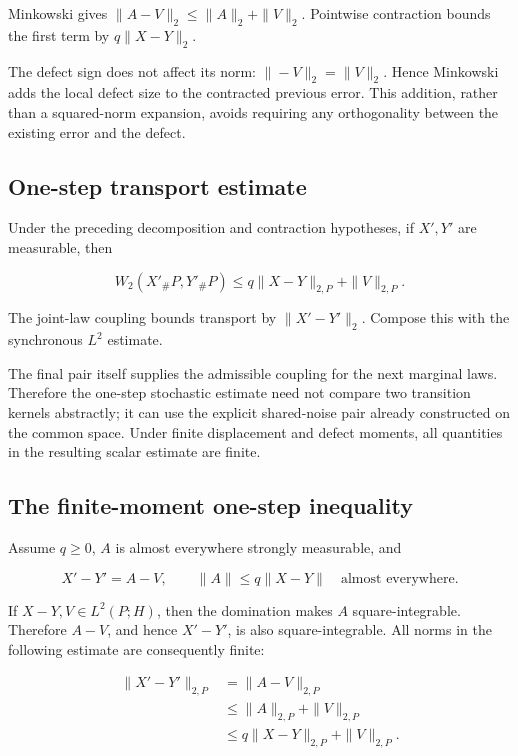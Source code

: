 \documentclass[11pt,a4paper]{article}
\begin{document}
Minkowski gives \(\|A-V\|_2\le\|A\|_2+\|V\|_2\). Pointwise contraction bounds the first term by \(q\|X-Y\|_2\).



The defect sign does not affect its norm: \(\|-V\|_2=\|V\|_2\). Hence Minkowski adds the local defect size to the contracted previous error. This addition, rather than a squared-norm expansion, avoids requiring any orthogonality between the existing error and the defect.


\subsection{\texorpdfstring{One-step transport estimate}{One-step transport estimate}}


Under the preceding decomposition and contraction hypotheses, if \(X',Y'\) are measurable, then

\[W_2(X'_\#P,Y'_\#P)\le q\|X-Y\|_{2,P}+\|V\|_{2,P}.\]

The joint-law coupling bounds transport by \(\|X'-Y'\|_2\). Compose this with the synchronous \(L^2\) estimate.



The final pair itself supplies the admissible coupling for the next marginal laws. Therefore the one-step stochastic estimate need not compare two transition kernels abstractly; it can use the explicit shared-noise pair already constructed on the common space. Under finite displacement and defect moments, all quantities in the resulting scalar estimate are finite.


\subsection{\texorpdfstring{The finite-moment one-step inequality}{The finite-moment one-step inequality}}


Assume \(q\ge0\), \(A\) is almost everywhere strongly measurable, and

\[X'-Y'=A-V,\qquad\|A\|\le q\|X-Y\|\quad\text{almost everywhere}.\]


If \(X-Y,V\in L^2(P;H)\), then the domination makes \(A\) square-integrable. Therefore \(A-V\), and hence \(X'-Y'\), is also square-integrable. All norms in the following estimate are consequently finite:

\[\begin{aligned}
\|X'-Y'\|_{2,P}&=\|A-V\|_{2,P}\\
&\le\|A\|_{2,P}+\|V\|_{2,P}\\
&\le q\|X-Y\|_{2,P}+\|V\|_{2,P}.
\end{aligned}\]
\end{document}
